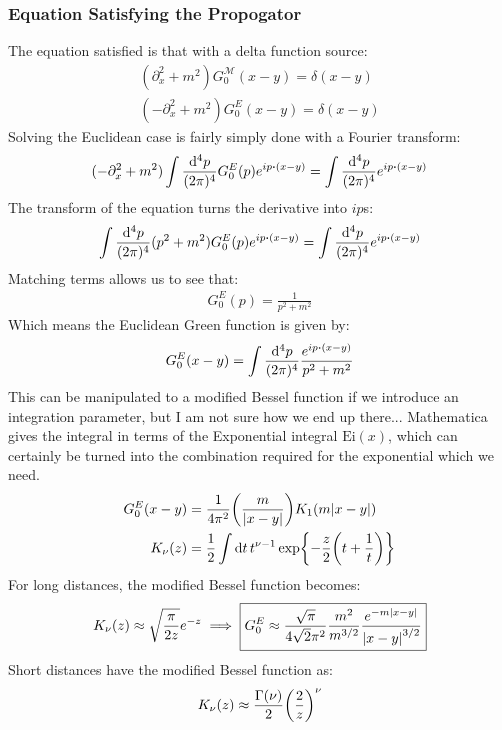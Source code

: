 \documentclass[12pt]{article}
\newcommand{\D}{\partial}
\begin{document}
\subsubsection{Equation Satisfying the Propogator}
The equation satisfied is that with a delta function source:
\begin{gather*}
  (\D_x^2+m^2)G_0^{\mathcal{M}}(x-y)=\delta(x-y)\\
  (-\D_x^2+m^2)G_0^{E}(x-y)=\delta(x-y)
\end{gather*}
Solving the Euclidean case is fairly simply done with a Fourier transform:
\begin{align*}
  (-\D^2_x+m^2)\int\frac{\dd[4]{p}}{(2\pi)^4}G_0^E(p)e^{ip\vdot(x-y)}=
  \int\frac{\dd[4]{p}}{(2\pi)^4}e^{ip\vdot(x-y)}
\end{align*}
The transform of the equation turns the derivative into $ip$s:
\begin{align*}
  \int\frac{\dd[4]{p}}{(2\pi)^4}(p^2+m^2)G_0^E(p)e^{ip\vdot(x-y)}=
  \int\frac{\dd[4]{p}}{(2\pi)^4}e^{ip\vdot(x-y)}
\end{align*}
Matching terms allows us to see that:
\begin{align*}
  G_0^E(p)=\frac{1}{p^2+m^2}
\end{align*}
Which means the Euclidean Green function is given by:
\begin{align*}
  G_0^E(x-y)=\int\frac{\dd[4]{p}}{(2\pi)^4}\frac{e^{ip\vdot(x-y)}}{p^2+m^2}
\end{align*}
This can be manipulated to a modified Bessel function if we introduce an integration parameter, but I am not sure how we end up there...
Mathematica gives the integral in terms of the Exponential integral $\mathrm{Ei}(x)$, which can certainly be turned into the combination required for the exponential which we need. 
\begin{align*}
  G_0^E(x-y)&=\frac{1}{4\pi^2}\qty(\frac{m}{\abs{x-y}})K_1(m\abs{x-y})\\
  K_\nu(z)&=\frac{1}{2}\int\dd{t}t^{\nu-1}\exp{-\frac{z}{2}\qty(t+\frac{1}{t})}
\end{align*}
For long distances, the modified Bessel function becomes:
\begin{align*}
  K_\nu(z)\approx\sqrt{\frac{\pi}{2z}}e^{-z}\implies
  \boxed{G_0^E\approx\frac{\sqrt{\pi}}{4\sqrt{2}\pi^2}\frac{m^2}{m^{3/2}}
  \frac{e^{-m\abs{x-y}}}{\abs{x-y}^{3/2}}}
\end{align*}
Short distances have the modified Bessel function as:
\begin{align*}
  K_\nu(z)\approx\frac{\Gamma(\nu)}{2}\qty(\frac{2}{z})^\nu
\end{align*}
\end{document}
